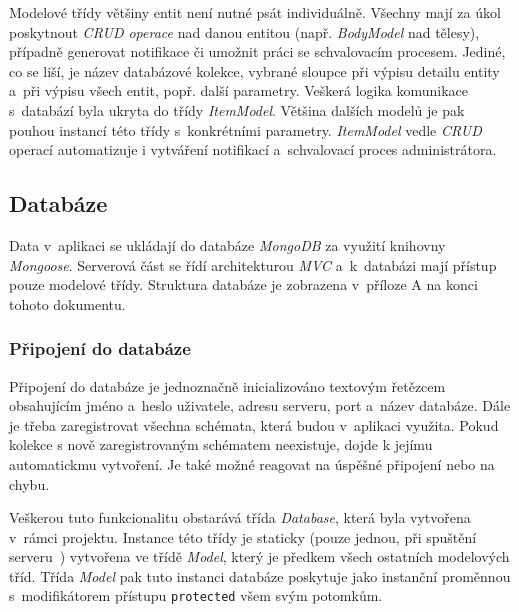 \documentclass[a4paper,12pt]{article}
\def\code#1{\texttt{#1}}
\begin{document}


Modelové třídy většiny entit není nutné psát individuálně. Všechny mají za úkol poskytnout \textit{CRUD operace} nad danou entitou (např. \textit{BodyModel} nad tělesy), případně generovat notifikace či umožnit práci se schvalovacím procesem. Jediné, co se liší, je název databázové kolekce, vybrané sloupce při výpisu detailu entity a~při výpisu všech entit, popř. další parametry. Veškerá logika komunikace s~databází byla ukryta do třídy \textit{ItemModel}. Většina dalších modelů je pak pouhou instancí této třídy s~konkrétními parametry. \textit{ItemModel} vedle \textit{CRUD} operací automatizuje i vytváření notifikací a~schvalovací proces administrátora.



\subsection{Databáze}

Data v~aplikaci se ukládají do databáze \textit{MongoDB} za využití knihovny \textit{Mongoose}. Serverová část se řídí architekturou \textit{MVC} a~k~databázi mají přístup pouze modelové třídy. Struktura databáze je zobrazena v~příloze A na konci tohoto dokumentu.

\subsubsection{Připojení do databáze}

Připojení do databáze je jednoznačně inicializováno textovým řetězcem obsahujícím jméno a~heslo uživatele, adresu serveru, port a~název databáze. Dále je třeba zaregistrovat všechna schémata, která budou v~aplikaci využita. Pokud kolekce s nově zaregistrovaným schématem neexistuje, dojde k jejímu automatickmu vytvoření. Je také možné reagovat na úspěšné připojení nebo na chybu.~\cite{nodebook}

Veškerou tuto funkcionalitu obstarává třída \textit{Database}, která byla vytvořena v~rámci projektu. Instance této třídy je staticky (pouze jednou, při spuštění serveru~\cite{nodebook}) vytvořena ve třídě \textit{Model}, který je předkem všech ostatních modelových tříd. Třída \textit{Model} pak tuto instanci databáze poskytuje jako instanční proměnnou s~modifikátorem přístupu \code{protected} všem svým potomkům.
\end{document}
